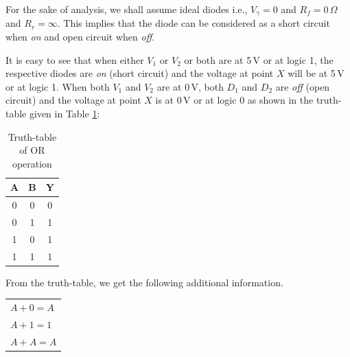 For the sake of analysis, we shall assume ideal diodes i.e., $V_{\gamma}=0$ and $R_{f}=0\,\Omega$ and $R_{r}=\infty$. This implies that the diode can be considered as a short circuit when {\em on} and open circuit when {\em off}.

It is easy to see that when either $V_{1}$ or $V_{2}$ or both are at 5\,V or at logic 1, the respective diodes are {\em on} (short circuit) and the voltage at point $X$ will be at 5\,V or at logic 1. When both $V_{1}$ and $V_{2}$ are at 0\,V, both $D_{1}$ and $D_{2}$ are {\em off} (open circuit) and the voltage at point $X$ is at 0\,V or at logic 0 as shown in the truth-table given in Table \ref{tab6.8}:
\begin{table}[H]
\centering
\caption{Truth-table of OR operation}\label{tab6.8}
\tabcolsep=8pt
\renewcommand{\arraystretch}{1.25}
\begin{tabular}{|cc|c|}
\hline
{\bf A} & {\bf B} & {\bf Y}\\
\hline
0 & 0 & 0\\
0 & 1 & 1\\
1 & 0 & 1\\
1 & 1 & 1\\
\hline
\end{tabular}
\end{table}

\eject

From the truth-table, we get the following additional information.
\begin{center}
\tabcolsep=8pt
\renewcommand{\arraystretch}{1.35}
\begin{tabular}{|l|}
\hline
$A+0=A$\\
$A+1=1$\\
$A+A=A$\\
\hline
\end{tabular}
\end{center}


